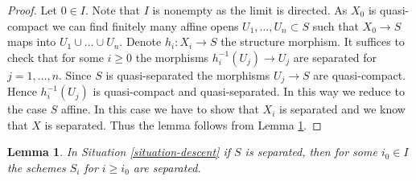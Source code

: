 \documentclass{amsart}
\theoremstyle{plain}
\newtheorem{lemma}[subsection]{Lemma}
\theoremstyle{definition}
\theoremstyle{remark}
\numberwithin{equation}{subsection}
\begin{document}
\begin{proof}
Let $0 \in I$. Note that $I$ is nonempty as the limit is directed.
As $X_0$ is quasi-compact we can find finitely many
affine opens $U_1, \ldots, U_n \subset S$ such that
$X_0 \to S$ maps into $U_1 \cup \ldots \cup U_n$.
Denote $h_i : X_i \to S$ the structure morphism.
It suffices to check that for some $i \geq 0$ the morphisms
$h_i^{-1}(U_j) \to U_j$ are separated for $j = 1, \ldots,  n$.
Since $S$ is quasi-separated the morphisms $U_j \to S$ are quasi-compact.
Hence $h_i^{-1}(U_j)$ is quasi-compact and quasi-separated.
In this way we reduce to the case $S$ affine. In this case we
have to show that $X_i$ is separated and we know that $X$ is separated.
Thus the lemma follows from Lemma \ref{lemma-limit-separated}.
\end{proof}


\begin{lemma}
\label{lemma-limit-separated}
In Situation \ref{situation-descent} if $S$ is separated,
then for some $i_0 \in I$ the schemes $S_i$ for $i \geq i_0$
are separated.
\end{lemma}
\end{document}
